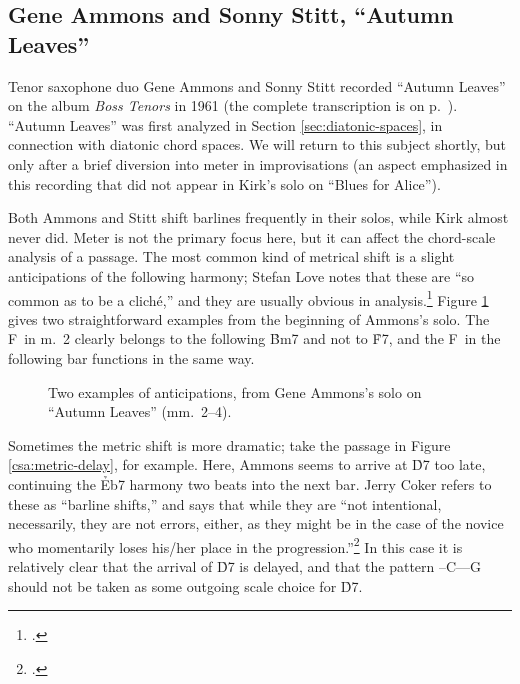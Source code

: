 \subsection{Gene Ammons and Sonny Stitt, “Autumn Leaves”}
\label{subsec:tenors-autumn-leaves}

Tenor saxophone duo Gene Ammons and Sonny Stitt recorded ``Autumn Leaves'' on
the album \emph{Boss Tenors} in 1961 (the complete transcription is on
p.~\pageref{transcription:autumn-leaves}). ``Autumn Leaves'' was first
analyzed in Section \ref{sec:diatonic-spaces}, in connection with diatonic
chord spaces. We will return to this subject shortly, but only after a brief
diversion into meter in improvisations (an aspect emphasized in this recording
that did not appear in Kirk's solo on ``Blues for Alice'').

Both Ammons and Stitt shift barlines frequently in their solos, while Kirk
almost never did. Meter is not the primary focus here, but it can affect the
chord-scale analysis of a passage. The most common kind of metrical
shift is a slight anticipations of the following harmony; Stefan Love notes
that these are ``so common as to be a cliché,'' and they are usually obvious
in analysis.\footcite[51]{love:2013} Figure \ref{csa:anticipation-simple}
gives two straightforward examples from the beginning of Ammons's solo. The
F\sharp\ in m.~2 clearly belongs to the following \h{Bm7} and not to \h{F7},
and the F\nat\ in the following bar functions in the same way.

\begin{figure}[tbp]
  \caption[Two examples of anticipations, from Gene Ammons's solo on ``Autumn
    Leaves.'']{Two examples of anticipations, from Gene Ammons's solo on
    ``Autumn Leaves'' (mm.~2--4).}
  \label{csa:anticipation-simple}
\end{figure}

Sometimes the metric shift is more dramatic; take the passage in Figure
\ref{csa:metric-delay}, for example. Here, Ammons seems to arrive at \h{D7}
too late, continuing the \h{Eb7} harmony two beats into the next bar. Jerry
Coker refers to these as ``barline shifts,'' and says that while they are
``not intentional, necessarily, they are not errors, either, as they might be
in the case of the novice who momentarily loses his/her place in the
progression.''\footcite[83]{coker:elements} In this case it is relatively
clear that the arrival of \h{D7} is delayed, and that the pattern
\Dflat--C--\Bflat--G should not be taken as some outgoing scale choice for
\h{D7}.

